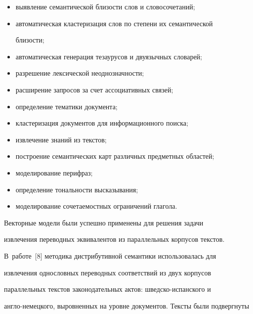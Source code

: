      \begin{itemize}


\item выявление семантической близости слов и словосочетаний;


\item автоматическая кластеризация слов по степени их семантической


близости;


\item автоматическая генерация тезаурусов и двуязычных словарей;


\item разрешение лексической неоднозначности;


\item расширение запросов за счет ассоциативных связей;


\item определение тематики документа;


\item кластеризация документов для информационного поиска;


\item извлечение знаний из текстов;


\item построение семантических карт различных предметных областей;


\item моделирование перифраз;


\item определение тональности высказывания;


\item моделирование сочетаемостных ограничений глагола.


\end{itemize}





     Векторные модели были успешно применены для решения задачи


извлечения переводных эквивалентов из параллельных корпусов текстов.


В~работе~[8] методика дистрибутивной семантики использовалась для


извлечения однословных переводных соответствий из двух корпусов


параллельных текстов законодательных актов: шведско-испанского и


англо-немецкого, выровненных на уровне документов. Тексты были подвергнуты


